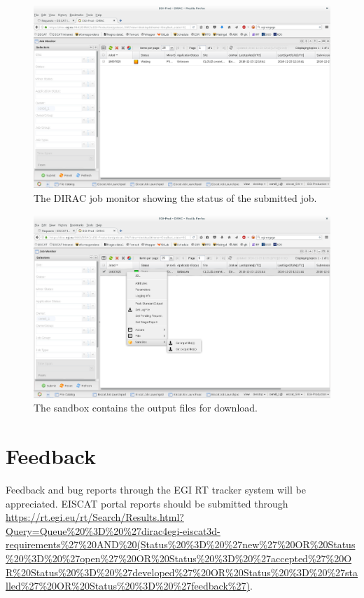 \documentclass[a4paper]{article}
\begin{document}
\begin{figure}[htb]
  \centering
  \includegraphics[width=1.0\linewidth]{dirac-gui-jobmon}
  \caption{The DIRAC job monitor showing the status of the submitted job.}
  \label{fig:monitor}
\end{figure}

\begin{figure}[htb]
  \centering
  \includegraphics[width=1.0\linewidth]{dirac-gui-job-get}
  \caption{The sandbox contains the output files for download.}
  \label{fig:sandbox}
\end{figure}

\section{Feedback}
\label{sec:feedback}
Feedback and bug reports through the EGI RT tracker system will be appreciated. EISCAT portal reports should be submitted through
 \url{https://rt.egi.eu/rt/Search/Results.html?Query=Queue\%20\%3D\%20\%27dirac4egi-eiscat3d-requirements\%27\%20AND\%20(Status\%20\%3D\%20\%27new\%27\%20OR\%20Status\%20\%3D\%20\%27open\%27\%20OR\%20Status\%20\%3D\%20\%27accepted\%27\%20OR\%20Status\%20\%3D\%20\%27developed\%27\%20OR\%20Status\%20\%3D\%20\%27stalled\%27\%20OR\%20Status\%20\%3D\%20\%27feedback\%27)}.
\end{document}
